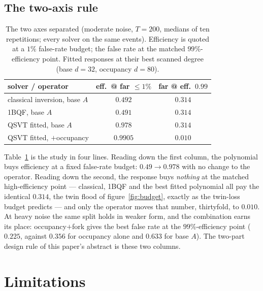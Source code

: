 \documentclass[11pt,a4paper]{article}
\begin{document}
\subsection{The two-axis rule}
\label{sec:atscale:rule}

\begin{table}[H]
\centering
\captionsetup{width=0.9\textwidth}
\caption{The two axes separated (moderate noise, $T{=}200$, medians
of ten repetitions; every solver on the same events). Efficiency is
quoted at a $1\%$ false-rate budget; the false rate at the matched
$99\%$-efficiency point. Fitted responses at their best scanned
degree (base $d{=}32$, occupancy $d{=}80$).}
\label{tab:twoaxis}
\begin{tabular}{lcc}
\hline
solver / operator & eff.\ @ far $\le1\%$ & far @ eff.\ $0.99$\\
\hline
classical inversion, base $A$ & $0.492$ & $0.314$\\
1BQF, base $A$                & $0.491$ & $0.314$\\
QSVT fitted, base $A$         & $0.978$ & $0.314$\\
QSVT fitted, $+$occupancy     & $\mathbf{0.9905}$ & $\mathbf{0.010}$\\
\hline
\end{tabular}
\end{table}

Table~\ref{tab:twoaxis} is the study in four lines. Reading down
the first column, the polynomial buys efficiency at a fixed
false-rate budget: $0.49\to0.978$ with no change to the operator.
Reading down the second, the response buys \emph{nothing} at the
matched high-efficiency point — classical, 1BQF and the best fitted
polynomial all pay the identical $0.314$, the twin flood of
figure~\ref{fig:budget}, exactly as the twin-loss budget predicts — and
only the operator moves that number, thirtyfold, to $0.010$. At
heavy noise the same split holds in weaker form, and the
combination earns its place: occupancy$+$fork gives the best
false rate at the $99\%$-efficiency point ($0.225$, against
$0.356$ for occupancy alone and $0.633$ for base $A$). The
two-part design rule of this paper's abstract is these two columns.

\section{Limitations}
\label{sec:limits}
\end{document}
